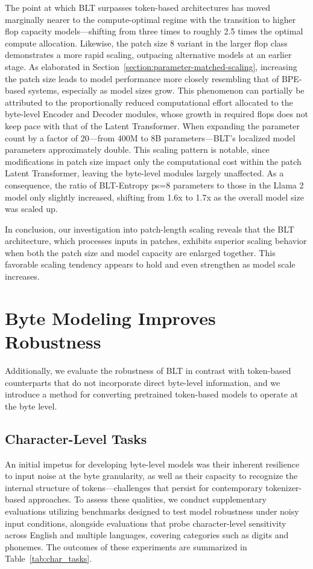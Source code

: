 The point at which {\textsc BLT} surpasses token-based architectures has moved marginally nearer to the compute-optimal regime with the transition to higher flop capacity models—shifting from three times to roughly 2.5 times the optimal compute allocation. Likewise, the patch size 8 variant in the larger flop class demonstrates a more rapid scaling, outpacing alternative models at an earlier stage. As elaborated in Section~\ref{section:parameter-matched-scaling}, increasing the patch size leads to model performance more closely resembling that of BPE-based systems, especially as model sizes grow. This phenomenon can partially be attributed to the proportionally reduced computational effort allocated to the byte-level Encoder and Decoder modules, whose growth in required flops does not keep pace with that of the Latent Transformer. When expanding the parameter count by a factor of 20—from 400M to 8B parameters—{\textsc BLT}'s localized model parameters approximately double. This scaling pattern is notable, since modifications in patch size impact only the computational cost within the patch Latent Transformer, leaving the byte-level modules largely unaffected. As a consequence, the ratio of {\textsc BLT}-Entropy ps=8 parameters to those in the Llama 2 model only slightly increased, shifting from 1.6x to 1.7x as the overall model size was scaled up.

In conclusion, our investigation into patch-length scaling reveals that the {\textsc BLT} architecture, which processes inputs in patches, exhibits superior scaling behavior when both the patch size and model capacity are enlarged together. This favorable scaling tendency appears to hold and even strengthen as model scale increases.

\section{Byte Modeling Improves Robustness} Additionally, we evaluate the robustness of {\textsc BLT} in contrast with token-based counterparts that do not incorporate direct byte-level information, and we introduce a method for converting pretrained token-based models to operate at the byte level.
\label{sec:robustness}

\subsection{Character-Level Tasks}

An initial impetus for developing byte-level models was their inherent resilience to input noise at the byte granularity, as well as their capacity to recognize the internal structure of tokens—challenges that persist for contemporary tokenizer-based approaches. To assess these qualities, we conduct supplementary evaluations utilizing benchmarks designed to test model robustness under noisy input conditions, alongside evaluations that probe character-level sensitivity across English and multiple languages, covering categories such as digits and phonemes. The outcomes of these experiments are summarized in Table~\ref{tab:char_tasks}.

